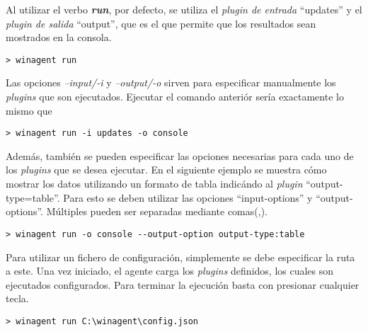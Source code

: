             Al utilizar el verbo \textbf{\textit{run}}, por defecto, se utiliza el \textit{plugin de entrada} ``updates'' y el \textit{plugin de salida} ``output'', que es el que permite que los resultados sean mostrados en la consola.
            
            \begin{lstlisting}[style=batch, caption=Ejecución por defecto]
                > winagent run
            \end{lstlisting}
            
            Las opciones \textit{--input/-i} y \textit{--output/-o} sirven para especificar manualmente los \textit{plugins} que son ejecutados. Ejecutar el comando anteriór sería exactamente lo mismo que 
            
            \begin{lstlisting}[style=batch, caption=Ejecución de forma manual]
                > winagent run -i updates -o console
            \end{lstlisting}
            
            Además, también se pueden especificar las opciones necesarias para cada uno de los \textit{plugins} que se desea ejecutar. En el siguiente ejemplo se muestra cómo mostrar los datos utilizando un formato de tabla indicándo al \textit{plugin} ``output-type=table''. Para esto se deben utilizar las opciones ``input-options'' y ``output-options''. Múltiples  pueden ser separadas mediante comas(,).
            
            \begin{lstlisting}[style=batch, caption=Ejecución de forma manual]
                > winagent run -o console --output-option output-type:table
            \end{lstlisting}

            Para utilizar un fichero de configuración, simplemente se debe especificar la ruta a este. Una vez iniciado, el agente carga los \textit{plugins} definidos, los cuales son ejecutados  configurados. Para terminar la ejecución basta con presionar cualquier tecla.
            
            \begin{lstlisting}[style=batch, caption=Ejecución utilizadno un fichero de configuración]
                > winagent run C:\winagent\config.json
            \end{lstlisting}
        
